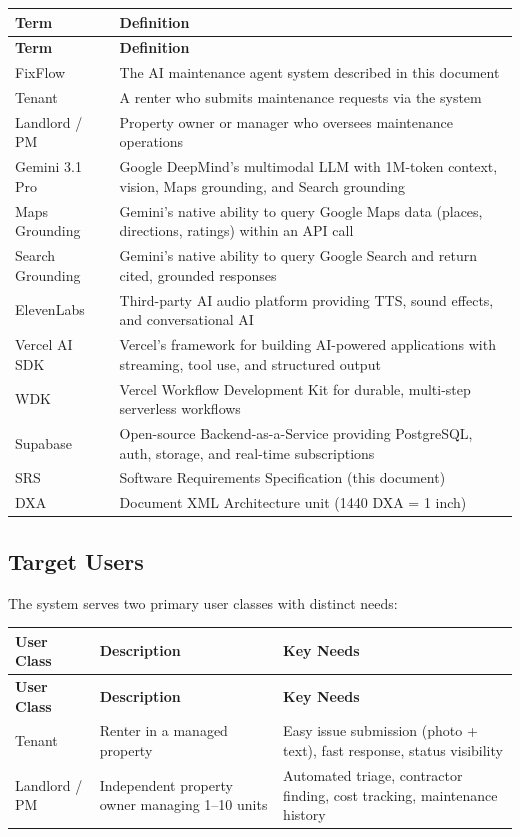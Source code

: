 \documentclass[12pt,a4paper]{article}
\begin{document}
\begin{longtable}{L{3.5cm} L{10.5cm}}
\toprule
\textbf{Term} & \textbf{Definition} \\
\midrule
\endfirsthead
\toprule
\textbf{Term} & \textbf{Definition} \\
\midrule
\endhead
\bottomrule
\endfoot
FixFlow & The AI maintenance agent system described in this document \\
\midrule
Tenant & A renter who submits maintenance requests via the system \\
\midrule
Landlord / PM & Property owner or manager who oversees maintenance operations \\
\midrule
Gemini 3.1 Pro & Google DeepMind's multimodal LLM with 1M-token context, vision, Maps grounding, and Search grounding \\
\midrule
Maps Grounding & Gemini's native ability to query Google Maps data (places, directions, ratings) within an API call \\
\midrule
Search Grounding & Gemini's native ability to query Google Search and return cited, grounded responses \\
\midrule
ElevenLabs & Third-party AI audio platform providing TTS, sound effects, and conversational AI \\
\midrule
Vercel AI SDK & Vercel's framework for building AI-powered applications with streaming, tool use, and structured output \\
\midrule
WDK & Vercel Workflow Development Kit for durable, multi-step serverless workflows \\
\midrule
Supabase & Open-source Backend-as-a-Service providing PostgreSQL, auth, storage, and real-time subscriptions \\
\midrule
SRS & Software Requirements Specification (this document) \\
\midrule
DXA & Document XML Architecture unit (1440 DXA = 1 inch) \\
\end{longtable}

\subsection{Target Users}

The system serves two primary user classes with distinct needs:

\begin{longtable}{L{2.5cm} L{5cm} L{6.5cm}}
\toprule
\textbf{User Class} & \textbf{Description} & \textbf{Key Needs} \\
\midrule
\endfirsthead
\toprule
\textbf{User Class} & \textbf{Description} & \textbf{Key Needs} \\
\midrule
\endhead
\bottomrule
\endfoot
Tenant & Renter in a managed property & Easy issue submission (photo + text), fast response, status visibility \\
\midrule
Landlord / PM & Independent property owner managing 1--10 units & Automated triage, contractor finding, cost tracking, maintenance history \\
\end{longtable}
\end{document}

